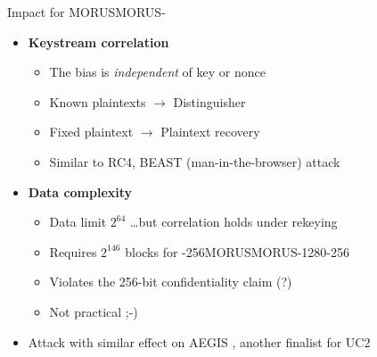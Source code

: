 \documentclass[aspectratio=169,table]{beamer}
\newcommand{\sn}[1]{\textcolor{gray}{\small #1}}
\newcommand{\cipher}[1]{\textsc{#1}}
\newcommand{\MORUS}[1][]{\ifx\relax#1\relax\cipher{MORUS}\else\cipher{MORUS-#1}\fi\xspace}
\begin{document}
\begin{frame}{Impact for \MORUS}%
  \begin{itemize}
    \item \textbf{Keystream correlation}
      \begin{itemize}
        \item The bias is \textit{independent} of key or nonce
        \item Known plaintexts $\to$ Distinguisher
        \item Fixed plaintext $\to$ Plaintext recovery
        \item Similar to RC4, BEAST (man-in-the-browser) attack
      \end{itemize}
      \pause
    \item \textbf{Data complexity}
      \begin{itemize}
        \item Data limit $2^{64}$
          \dots but correlation holds under rekeying
        \item Requires $2^{146}$ blocks for \MORUS[1280-256] 
        \item Violates the 256-bit confidentiality claim (?)
        \item Not practical ;-)
      \end{itemize}
    \item Attack with similar effect on \cipher{AEGIS} \sn{\cite{AEGIS,sacryptMinaud14}}, another finalist for UC2\!
  \end{itemize}
\end{frame}%

\end{document}
